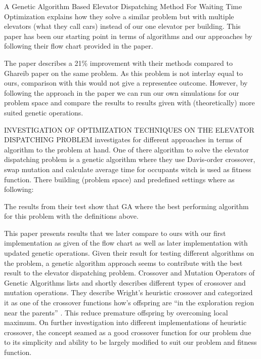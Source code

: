 
A Genetic Algorithm Based Elevator Dispatching Method For Waiting Time Optimization \cite{tartan2016genetic} explains how they solve a similar problem but with multiple elevators (what they call cars) instead of our one elevator per building. This paper has been our starting point in terms of algorithms and our approaches by following their flow chart provided in the paper.

The paper describes a 21\% improvement with their methods compared to Ghareib paper \cite{gharieb2005optimal} on the same problem. As this problem is not interlay equal to ours, comparison with this would not give a representee outcome. However, by following the approach in the paper we can run our own simulations for our problem space and compare the results to results given with (theoretically) more suited genetic operations.

INVESTIGATION OF OPTIMIZATION TECHNIQUES ON THE ELEVATOR DISPATCHING PROBLEM \cite{ahmed2022investigation} investigates for different approaches in terms of algorithm to the problem at hand.  One of there algorithm to solve the elevator dispatching problem is a genetic algorithm where they use Davis-order crossover, swap mutation and calculate average time for occupants  witch is used as fitness function. There building (problem space) and predefined settings where as following:

The results from their test show that GA where the best performing algorithm for this problem with the definitions above.

This paper presents results that we later compare to ours with our first implementation as given of the flow chart\cite{tartan2016genetic} as well as later implementation with updated genetic operations. Given their result for testing different algorithms on the problem, a genetic algorithm approach seems to contribute with the best result to the elevator dispatching problem.
Crossover and Mutation Operators of Genetic Algorithms \cite{ahmed2022investigation} lists and shortly describes different types of crossover and mutation operations. They describe Wright's heuristic crossover and categorized it as one of the crossover functions how’s offspring are “in the exploration region near the parents” \cite{ahmed2022investigation}. This reduce premature offspring by overcoming local maximum. On further investigation into different implementations of heuristic crossover, the concept seamed as a good crossover function for our problem due to its simplicity and ability to be largely modified to suit our problem and fitness function.


